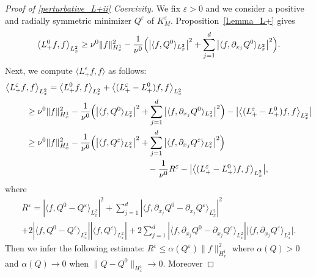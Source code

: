 \documentclass[JEP,XML,SOM,NoEqCountersInSection,NoFloatCountersInSection,Unicode,published]{cedram}
\theoremstyle{definition}
\newenvironment{ProofOf}[1]{\begin{proof}[Proof of #1]}{\end{proof}}
\begin{document}
\begin{ProofOf}{\eqref{perturbative_L+ii} Coercivity}
We fix $\varepsilon>0$ and we consider a positive and radially symmetric minimizer $Q^{\varepsilon}$ of $K_{M}^{\varepsilon}$. Proposition~\ref{Lemma_L+} gives
\[
\left\langle L_{+}^{0}f,f\right\rangle_{L_{x}^{2}}\geq\nu^{0}\|f\|_{H_{x}^{1}}^{2}-\frac{1}{\nu^{0}}\Bigl(\left|\langle f,Q^{0}\rangle_{L_{x}^{2}}\right|^{2}+\sum\limits_{j=1}^{d}\left|\langle f,\partial_{x_{j}}Q^{0}\rangle_{L_{x}^{2}}\right|^{2}\Bigr).
\]
Next, we compute $\langle L_{+}^{\varepsilon}f,f\rangle$ as follows:
\begin{align*}
\bigl\langle L_{+}^{\varepsilon}f&,f\bigr\rangle_{L_{x}^{2}}=\left\langle L_{+}^{0}f,f\right\rangle_{L_{x}^{2}}+\left\langle (L_{+}^{\varepsilon}-L_{+}^{0})f,f\right\rangle_{L_{x}^{2}}\\
&\geq\nu^{0}\|f\|_{H_{x}^{1}}^{2}-\frac{1}{\nu^{0}}\Bigl(\left|\langle f,Q^{0}\rangle_{L_{x}^{2}}\right|^{2}+\sum\limits_{j=1}^{d}\left|\langle f,\partial_{x_{j}}Q^{0}\rangle_{L_{x}^{2}}\right|^{2}\Bigr)-\bigl|\left\langle(L_{+}^{\varepsilon}-L_{+}^{0})f,f\right\rangle_{L_{x}^{2}}\bigr|
\\
&\geq\nu^{0}\|f\|_{H_{x}^{1}}^{2}-\frac{1}{\nu^{0}}\Bigl(\left|\langle f,Q^{\varepsilon}\rangle_{L_{x}^{2}}\right|^{2}+\sum\limits_{j=1}^{d}\left|\langle f,\partial_{x_{j}}Q^{\varepsilon}\rangle_{L_{x}^{2}}\right|^{2}\Bigr)
\\
&\hspace*{5cm}-\frac{1}{\nu^{0}}R^{\varepsilon}-\bigl|\left\langle(L_{+}^{\varepsilon}-L_{+}^{0})f,f\right\rangle_{L_{x}^{2}}\bigr|,
\end{align*}
where\vspace*{-5pt}
\begin{multline*}
R^{\varepsilon}=\left|\langle f,Q^{0}-Q^{\varepsilon}\rangle_{L_{x}^{2}}\right|^{2}+\sum\limits_{j=1}^{d}\left|\langle f,\partial_{x_{j}}Q^{0}-\partial_{x_{j}}Q^{\varepsilon}\rangle_{L_{x}^{2}}\right|^{2}\\[
-8pt]
+2\left|\langle f,Q^{0}-Q^{\varepsilon}\rangle_{L_{x}^{2}}\right|\left|\langle f,Q^{\varepsilon}\rangle_{L_{x}^{2}}\right|+2\sum\limits_{j=1}^{d}\left|\langle f,\partial_{x_{j}}Q^{0}-\partial_{x_{j}}Q^{\varepsilon}\rangle_{L_{x}^{2}}\right|\bigl|\langle f,\partial_{x_{j}}Q^{\varepsilon}\rangle_{L_{x}^{2}}\bigr|.
\end{multline*}
Then we infer the following estimate: $R^{\varepsilon}\!\leq\!\alpha(Q^{\varepsilon})\|f\|_{H_{x}^{1}}^{2}$ where $\alpha(Q)\!>\!0$ and \hbox{$\alpha(Q)\!\to\! 0$} when $\|Q-Q^{0}\|_{H_{x}^{1}}\to 0$. Moreover\vspace*{-5pt}

\end{ProofOf}
\end{document}
